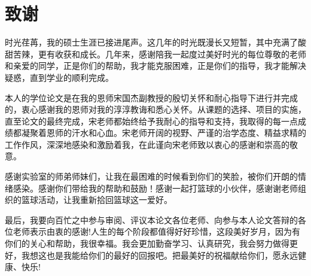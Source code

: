 
\chapter{致谢}
时光荏苒，我的硕士生涯已接进尾声。这几年的时光既漫长又短暂，其中充满了酸甜苦辣，更有收获和成长。几年来，感谢陪我一起度过美好时光的每位尊敬的老师和亲爱的同学，正是你们的帮助，我才能克服困难，正是你们的指导，我才能解决疑惑，直到学业的顺利完成。

本人的学位论文是在我的恩师宋国杰副教授的殷切关怀和耐心指导下进行并完成的，衷心感谢我的恩师对我的淳淳教诲和悉心关怀。从课题的选择、项目的实施，直至论文的最终完成，宋老师都始终给予我耐心的指导和支持，我取得的每一点成绩都凝聚着恩师的汗水和心血。宋老师开阔的视野、严谨的治学态度、精益求精的工作作风，深深地感染和激励着我，在此谨向宋老师致以衷心的感谢和崇高的敬意。

感谢实验室的师弟师妹们，让我在最困难的时候看到你们的笑脸，被你们开朗的情绪感染。感谢你们带给我的帮助和鼓励！感谢一起打篮球的小伙伴，感谢谢老师组织的篮球活动，让我重新拾回篮球这一爱好。

最后，我要向百忙之中参与审阅、评议本论文各位老师、向参与本人论文答辩的各位老师表示由衷的感谢!人生的每个阶段都值得好好珍惜，这段美好岁月，因为有你们的关心和帮助，我很幸福。我会更加勤奋学习、认真研究，我会努力做得更好，我想这也是我能给你们的最好的回报吧。把最美好的祝福献给你们，愿永远健康、快乐!